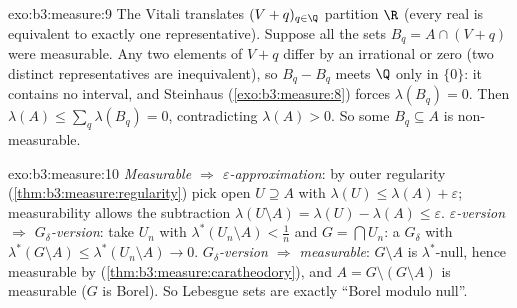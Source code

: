 \begin{solution}{exo:b3:measure:9}
The Vitali translates $(V + q)_{q\in\Q}$ partition $\R$ (every
real is equivalent to exactly one representative). Suppose all
the sets $B_q = A \cap (V + q)$ were measurable. Any two
elements of $V + q$ differ by an irrational or zero (two
distinct representatives are inequivalent), so $B_q - B_q$
meets $\Q$ only in $\{0\}$: it contains no interval, and
Steinhaus (\cref{exo:b3:measure:8}) forces $\lambda(B_q) = 0$.
Then $\lambda(A) \leq \sum_{q}\lambda(B_q) = 0$, contradicting
$\lambda(A) > 0$. So some $B_q \subseteq A$ is non-measurable.
\end{solution}

\begin{solution}{exo:b3:measure:10}
\emph{Measurable $\Rightarrow$ $\varepsilon$-approximation}: by
outer regularity (\cref{thm:b3:measure:regularity}) pick open
$U \supseteq A$ with $\lambda(U) \leq \lambda(A) +
\varepsilon$; measurability allows the subtraction
$\lambda(U\setminus A) = \lambda(U) - \lambda(A) \leq
\varepsilon$. \emph{$\varepsilon$-version $\Rightarrow$
$G_\delta$-version}: take $U_n$ with $\lambda^*(U_n\setminus
A) < \frac1n$ and $G = \bigcap U_n$: a $G_\delta$ with
$\lambda^*(G\setminus A) \leq \lambda^*(U_n\setminus A) \to 0$.
\emph{$G_\delta$-version $\Rightarrow$ measurable}: $G\setminus
A$ is $\lambda^*$-null, hence measurable by 
(\cref{thm:b3:measure:caratheodory}), and $A = G \setminus
(G\setminus A)$ is measurable ($G$ is Borel). So Lebesgue sets
are exactly ``Borel modulo null''.
\end{solution}

